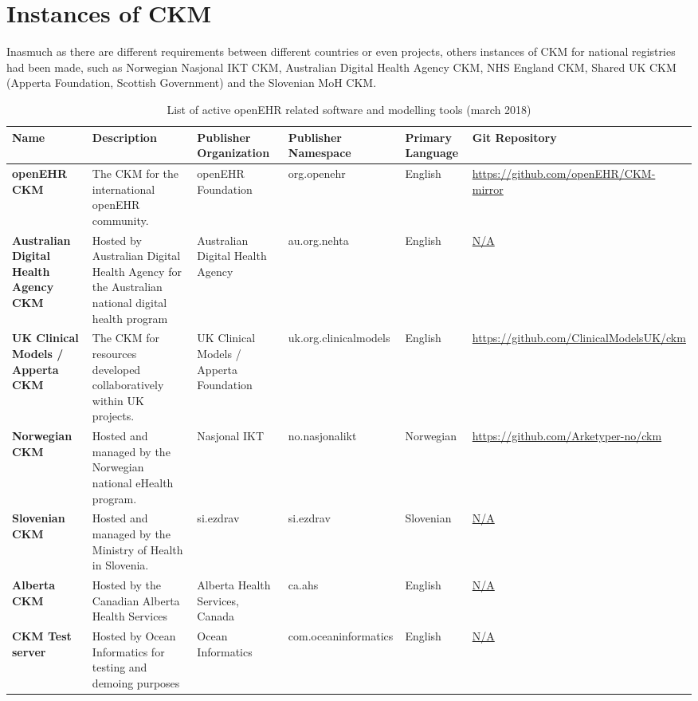 \documentclass[mim_thesis.tex]{subfiles}
\begin{document}
\section{Instances of CKM}
Inasmuch as there are different requirements between different countries or even projects, others instances of CKM for national registries had been made, such as Norwegian Nasjonal IKT CKM, Australian Digital Health Agency CKM, NHS England CKM, Shared UK CKM (Apperta Foundation, Scottish Government) and the Slovenian MoH CKM.

\begin{table}[H]
\centering
\caption{ List of active openEHR related software and modelling tools (march 2018)}
\label{tab:tools}
\begin{tabular}{p{1.5cm} p{3cm} p{2cm} p{3cm} p{1.7cm} p{3cm}}
\toprule[2pt]
\textbf{Name} & \textbf{Description} & \textbf{Publisher Organization} & \textbf{Publisher Namespace} & \textbf{Primary Language}  & \textbf{Git Repository}                                                         \\ \midrule[2pt]
\textbf{openEHR CKM}  & The CKM for the international openEHR community. & openEHR Foundation  & org.openehr & English & \url{https://github.com/openEHR/CKM-mirror}                                                       \\ \midrule
\textbf{Australian Digital Health Agency CKM} & Hosted by Australian Digital Health Agency for the Australian national digital health program & Australian Digital Health Agency & au.org.nehta & English &\url{N/A} \\ \midrule
\textbf{UK Clinical Models / Apperta CKM} & The CKM for resources developed collaboratively within UK projects. & UK Clinical Models / Apperta Foundation & uk.org.clinicalmodels & English & \url{https://github.com/ClinicalModelsUK/ckm}       
\\ \midrule
\textbf{Norwegian CKM} & Hosted and managed by the Norwegian national eHealth program.                        & Nasjonal IKT & no.nasjonalikt & Norwegian & \url{https://github.com/Arketyper-no/ckm}      
\\ \midrule
\textbf{Slovenian CKM} & Hosted and managed by the Ministry of Health in Slovenia. & si.ezdrav & si.ezdrav & Slovenian & \url{N/A}                                                         
\\ \midrule
\textbf{Alberta CKM} & Hosted by the Canadian Alberta Health Services  & Alberta Health Services, Canada  & ca.ahs & English & \url{N/A}                                           
\\ \midrule
\textbf{CKM Test server}  & Hosted by Ocean Informatics for testing and demoing purposes & Ocean Informatics  & com.oceaninformatics & English & \url{N/A}                           
\\ \bottomrule[2pt]
\end{tabular}
\end{table}
\end{document}
